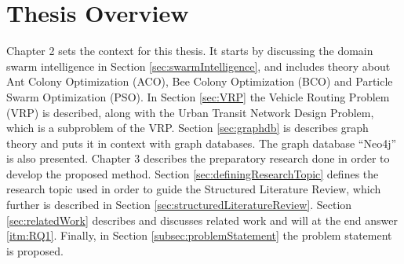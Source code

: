 \section{Thesis Overview}



Chapter 2 sets the context for this thesis. It starts by discussing the domain swarm intelligence in Section \ref{sec:swarmIntelligence}, and includes theory about Ant Colony Optimization (ACO), Bee Colony Optimization (BCO) and Particle Swarm Optimization (PSO). In Section \ref{sec:VRP} the Vehicle Routing Problem (VRP) is described, along with the Urban Transit Network Design Problem, which is a subproblem of the VRP. Section \ref{sec:graphdb} is describes graph theory and puts it in context with graph databases. The graph database ``Neo4j'' is also presented. 
\newline
\newline
Chapter 3 describes the preparatory research done in order to develop the proposed method. Section \ref{sec:definingResearchTopic} defines the research topic used in order to guide the Structured Literature Review\citep{kofod2014}, which further is described in Section \ref{sec:structuredLiteratureReview}. Section \ref{sec:relatedWork} describes and discusses related work and will at the end answer \ref{itm:RQ1}. Finally, in Section \ref{subsec:problemStatement} the problem statement is proposed.  
\newline
\newline
